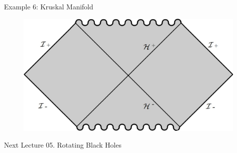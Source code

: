 \documentclass{beamer}
\begin{document}
        \begin{frame}{Example 6: Kruskal Manifold}
        	\begin{center}
				\begin{figure}
				\includegraphics[scale=0.75] {fig19.jpg}
				\end{figure}
			\end{center}	
        \end{frame}
		 
  \begin{darkframes}    
  		\begin{frame}{Next Lecture}
        	\Large
			{05. Rotating Black Holes}
		\end{frame}
  
  \end{darkframes}
\end{document}

